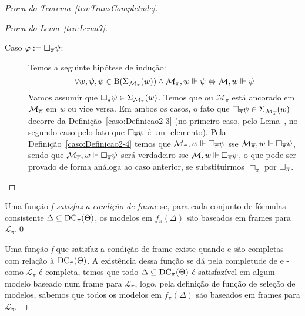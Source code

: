 \begin{apendicesenv}
\begin{proof}[Prova do Teorema~\ref{teo:TransCompletude}]
\begin{proof}[Prova do Lema~\ref{teo:Lema7}]
\begin{description}
                    \item[\textnormal{Caso \(\varphi := \Box_{\overline{\pi}} \psi\):}] Temos a seguinte hipótese de indução:
                    \[
                        \forall w, \psi, \psi \in \operatorname{B}(\Sigma_{\mathcal{M}_{\pi}}(w)) \land \mathcal{M}_{\pi}, w \Vdash \psi \Leftrightarrow \mathcal{M}, w \Vdash \psi
                    \]
                    Vamos assumir que \(\Box_{\overline{\pi}} \psi \in \Sigma_{\mathcal{M}_{\pi}}(w)\). Temos que ou \(\mathcal{M}_{\pi}\) está ancorado em
                    \(\mathcal{M}_{\overline{\pi}}\) em \textit{w} ou vice versa. Em ambos os casos, o fato que \(\Box_{\overline{\pi}} \psi \in \Sigma_{\mathcal{M}_{\overline{\pi}}}(w)\) decorre da
                    Definição~\ref{caso:Definicao2-3} (no primeiro caso, pelo Lema~, no segundo caso pelo fato que \(\Box_{\overline{\pi}} \psi\) é um \PI-elemento).
                    Pela Definição~\ref{caso:Definicao2-4} temos que \(\mathcal{M}_{\pi}, w \Vdash \Box_{\overline{\pi}} \psi\) sse \(\mathcal{M}_{\overline{\pi}}, w \Vdash \Box_{\overline{\pi}} \psi\),
                    sendo que \(\mathcal{M}_{\overline{\pi}}, w \Vdash \Box_{\overline{\pi}} \psi\) será verdadeiro sse \(\mathcal{M}, w \Vdash \Box_{\overline{\pi}} \psi\), o que pode ser provado de forma análoga ao
                    caso anterior, se substituirmos \(\Box_{\pi}\) por \(\Box_{\overline{\pi}}\). \qedhere
                \end{description}
            \end{proof}

            \begin{definicao}
                \label{def:CondicaoFrame}
                Uma função \textit{f satisfaz a condição de frame} se, para cada conjunto de fórmulas -consistente \(\Delta \subseteq \operatorname{DC}_{\pi}(\Theta)\),
                os modelos em \(f_{\pi}(\Delta)\) são baseados em frames para \(\mathcal{L}_{\pi}\).\qed
            \end{definicao}

            Uma função \textit{f} que satisfaz a condição de frame existe quando  e  são completas com relação à \(\operatorname{DC}_{\pi}(\Theta)\).
            A existência dessa função se dá pela completude de  e  - como \(\mathcal{L}_{\pi}\) é completa, temos que todo
            \(\Delta \subseteq \operatorname{DC}_{\pi}(\Theta)\) é satisfazível em algum modelo baseado num frame para \(\mathcal{L}_{\pi}\), logo, pela definição de função de seleção de
            modelos, sabemos que todos os modelos em \(f_{\pi}(\Delta)\) são baseados em frames para \(\mathcal{L}_{\pi}\).


\end{proof}
\end{apendicesenv}

